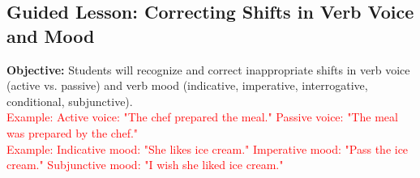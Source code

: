 \documentclass[12pt]{article}
\title{}
\date{}
\begin{document}
\subsection*{Guided Lesson: Correcting Shifts in Verb Voice and Mood}
\onehalfspacing

\begin{tcolorbox}[colframe=black!40, colback=gray!5, 
coltitle=black, colbacktitle=black!20, fonttitle=\bfseries\Large, 
title=Learning Objective, halign title=center, left=5pt, right=5pt, top=5pt, bottom=15pt]
\textbf{Objective:} Students will recognize and correct inappropriate shifts in verb voice (active vs. passive) and verb mood (indicative, imperative, interrogative, conditional, subjunctive). \\
\textcolor{red}{Example: Active voice: "The chef prepared the meal." Passive voice: "The meal was prepared by the chef."} \\
\textcolor{red}{Example: Indicative mood: "She likes ice cream." Imperative mood: "Pass the ice cream." Subjunctive mood: "I wish she liked ice cream."}
\end{tcolorbox}

\vspace{1em}
\end{document}
